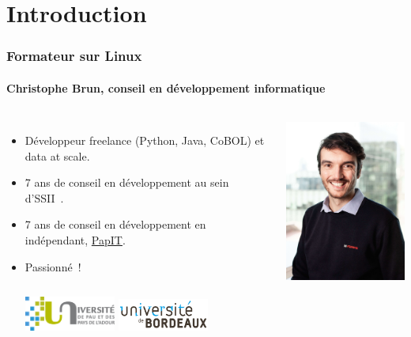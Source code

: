 \documentclass{beamer}
\begin{document}
    \section{Introduction}\label{sec:introduction}

    \begin{frame}
        \transdissolve
        \frametitle{Formateur sur Linux}
        \framesubtitle{Christophe Brun, conseil en développement informatique}

        \begin{columns}
            \begin{itemize}
                \item Développeur freelance (Python, Java, CoBOL) et data at scale.

                \item 7 ans de conseil en développement au sein d'SSII~.

                \item 7 ans de conseil en développement en indépendant, \href{https://papit.fr}{PapIT}.

                \item Passionné~!
                \bigbreak
                \begin{columns}
                    \centering
                    \includegraphics[width=3cm]{image/logo-uppa}
                    \centering
                    \includegraphics[width=3cm]{image/logo-universite-bordeaux}
                \end{columns}
            \end{itemize}
            \centering
            \includegraphics[width=5cm]{image/trombine-christophe}
        \end{columns}
    \end{frame}
\end{document}
